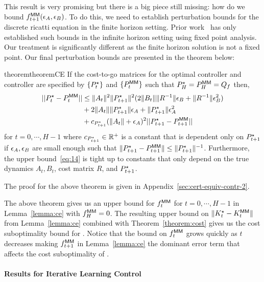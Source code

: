 This result is very promising but there is a big piece still missing: how do we
bound $f^\mathsf{MM}_{t+1}(\epsilon_A, \epsilon_B)$. To do this, we need to establish perturbation
bounds for the discrete ricatti equation in the finite
horizon setting. Prior work~\cite{konstantinov93, mania19} has only established such
bounds in the infinite horizon setting using fixed point analysis. Our treatment
is significantly different as the finite horizon solution is not a fixed point.
Our final perturbation bounds are presented in the theorem below:
\begin{restatable}{theorem}{theoremCE}
  \label{theorem:ce}
  If the cost-to-go matrices for the optimal controller and \MM{}
  controller are specified by $\{P^\star_t\}$ and $\{P^\mathsf{MM}_t\}$ such that
  $P^\star_H = P^\mathsf{MM}_H = Q_f$ then,
  \begin{align}
    \label{eq:14}
    ||P^\star_{t} - P^\mathsf{MM}_{t}|| &\leq  \|A_{t}\|^{2}\|P^\star_{t+1}\|^{2}(2\|B_{t}\|\|R^{-1}\|\epsilon_B + \|R^{-1}\|\epsilon_B^{2}) \nonumber\\
    &+ 2\|A_{t}\|\|P^\star_{t+1}\|\epsilon_A + \|P^\star_{t+1}\|\epsilon_A^{2} \nonumber\\
                        &+ c_{P^\star_{t+1}}(\|A_{t}\|+ \epsilon_A)^{2}||P^\star_{t+1} - P^\mathsf{MM}_{{t+1}}||
  \end{align}
  for $t=0, \cdots, H-1$ where $c_{P^\star_{t+1}} \in \mathbb{R}^+$  is a constant that is
  dependent only on $P^\star_{t+1}$ if $\epsilon_A, \epsilon_B$ are small enough such
  that $\|P^\star_{t+1} - P^\mathsf{MM}_{t+1}\| \leq \|P^\star_{t+1}\|^{-1}$. Furthermore, the upper
  bound~\eqref{eq:14} is tight up to constants that only depend on the
  true dynamics $A_t, B_t$, cost matrix $R$, and $P^\star_{t+1}$.
\end{restatable}
The proof for the above theorem is given in Appendix~\ref{sec:cert-equiv-contr-2}.

The above theorem gives us an upper bound for $f^\mathsf{MM}_{t}$ for $t=0,
\cdots, H-1$ in
Lemma~\ref{lemma:ce} with $f^\mathsf{MM}_H = 0$. The resulting upper bound on $\|K^\star_t -
K^\mathsf{MM}_t\|$ from Lemma~\ref{lemma:ce} combined with
Theorem~\ref{theorem:cost} gives us the cost 
suboptimality bound for \MM{}. Notice that the
bound on $f^\mathsf{MM}_t$ grows quickly as $t$ decreases making $f^\mathsf{MM}_{t+1}$
in Lemma~\ref{lemma:ce} the dominant error term that affects the cost
suboptimality of \MM{}.

\paragraph{Results for Iterative Learning Control}
\label{sec:iter-learn-contr-3}

